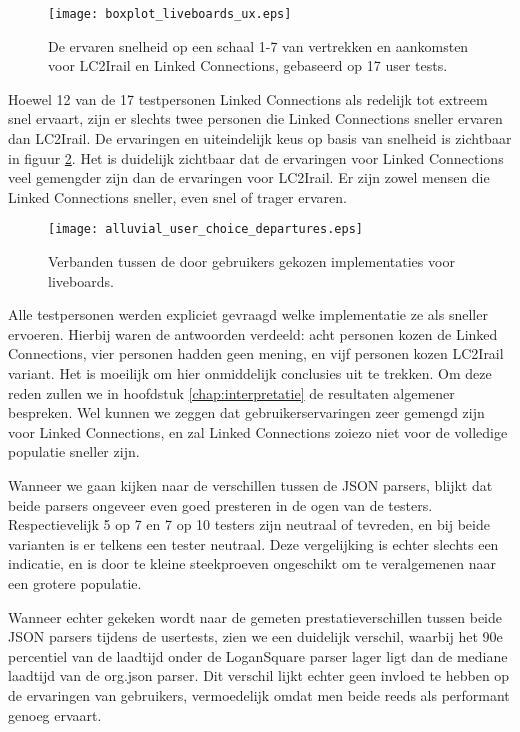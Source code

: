 \begin{figure}[h]
	\centering
	\texttt{[image: boxplot\_liveboards\_ux.eps]}
	\caption[Ervaren snelheid van liveboards]{De ervaren snelheid op een schaal 1-7 van vertrekken en aankomsten voor LC2Irail en Linked Connections, gebaseerd op 17 user tests.}
	\label{fig:liveboardsUx}
\end{figure}

Hoewel 12 van de 17 testpersonen Linked Connections als redelijk tot extreem snel ervaart, zijn er slechts twee personen die Linked Connections sneller ervaren dan LC2Irail. De ervaringen en uiteindelijk keus op basis van snelheid is zichtbaar in figuur \ref{fig:alluvialUserChoicesLiveboards}. Het is duidelijk zichtbaar dat de ervaringen voor Linked Connections veel gemengder zijn dan de ervaringen voor LC2Irail. Er zijn zowel mensen die Linked Connections sneller, even snel of trager ervaren. 

\begin{figure}[ht]
	\centering
	\texttt{[image: alluvial\_user\_choice\_departures.eps]}
	\caption[Door gebruikers gekozen implementatie voor liveboards]{Verbanden tussen de door gebruikers gekozen implementaties voor liveboards. }
	\label{fig:alluvialUserChoicesLiveboards}
\end{figure}

Alle testpersonen werden expliciet gevraagd welke implementatie ze als sneller ervoeren. Hierbij waren de antwoorden verdeeld: acht personen kozen de Linked Connections, vier personen hadden geen mening, en vijf personen kozen LC2Irail variant. Het is moeilijk om hier onmiddelijk conclusies uit te trekken. Om deze reden zullen we in hoofdstuk \ref{chap:interpretatie} de resultaten algemener bespreken. Wel kunnen we zeggen dat gebruikerservaringen zeer gemengd zijn voor Linked Connections, en zal Linked Connections zoiezo niet voor de volledige populatie sneller zijn.

Wanneer we gaan kijken naar de verschillen tussen de JSON parsers, blijkt dat beide parsers ongeveer even goed presteren in de ogen van de testers. Respectievelijk 5 op 7 en 7 op 10 testers zijn neutraal of tevreden, en bij beide varianten is er telkens een tester neutraal. Deze vergelijking is echter slechts een indicatie, en is door te kleine steekproeven ongeschikt om te veralgemenen naar een grotere populatie.

Wanneer echter gekeken wordt naar de gemeten prestatieverschillen tussen beide JSON parsers tijdens de usertests, zien we een duidelijk verschil, waarbij het 90e percentiel van de laadtijd onder de LoganSquare parser lager ligt dan de mediane laadtijd van de org.json parser. Dit verschil lijkt echter geen invloed te hebben op de ervaringen van gebruikers, vermoedelijk omdat men beide reeds als performant genoeg ervaart. %

